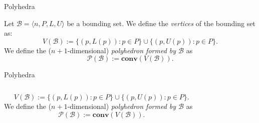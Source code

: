 \begin{frame}[fragile]{Polyhedra}
    \begin{definition}
        Let $ \mathcal{B} = \langle n,P,L,U \rangle $ be a bounding set. We define the \emph{vertices} of the bounding set as:
        \[
        V(\mathcal{B}) := \{(p,L(p)) : p \in P\} \cup \{(p,U(p)) : p \in P\}.
        \]
        We define the ($n+1$-dimensional) \emph{polyhedron formed by $ \mathcal{B} $ } as
        \[
        \mathcal{P}(\mathcal{B}) := \mathbf{conv}(V(\mathcal{B})).
        \]
        \end{definition}
\end{frame}

\begin{frame}[fragile]{Polyhedra}
    \begin{columns}
        \begin{column}{0.55\textwidth}
            \begin{definition}
                \[
                V(\mathcal{B}) := \{(p,L(p)) : p \in P\} \cup \{(p,U(p)) : p \in P\}.
                \]
                We define the ($n+1$-dimensional) \emph{polyhedron formed by $ \mathcal{B} $ } as
                \[
                \mathcal{P}(\mathcal{B}) := \mathbf{conv}(V(\mathcal{B})).
                \]
                \end{definition}
        \end{column}
        \begin{column}{0.45\textwidth}
            \centering
            \begin{figure}
                                
            \end{figure}
        \end{column}
    \end{columns}
\end{frame}

